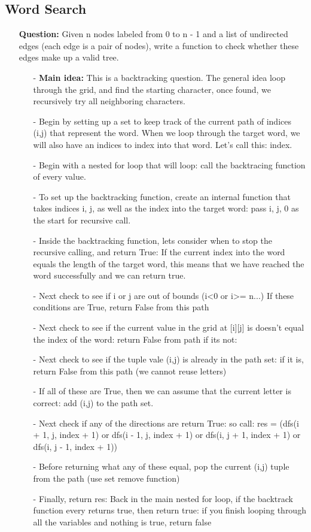 \documentclass[12pt]{article}
\begin{document}
\subsection{Word Search}
\begin{enumerate}
  \item[] \textbf{Question:} Given n nodes labeled from 0 to n - 1 and a list of undirected edges (each edge is a pair of nodes), write a function to check whether these edges make up a valid tree.

    \begin{enumerate}
      \item[-] \textbf{Main idea:} This is a backtracking question. The general idea loop through the grid, and find the starting character, once found, we recursively try all neighboring characters. 
      \item[-] Begin by setting up a set to keep track of the current path of indices (i,j) that represent the word. When we loop through the target word, we will also have an indices to index into that word. Let's call this: index.
      \item[-] Begin with a nested for loop that will loop: call the backtracing function of every value. 
      \item[-] To set up the backtracking function, create an internal function that takes indices i, j, as well as the index into the target word: pass i, j, 0 as the start for recursive call.
      \item[-] Inside the backtracking function, lets consider when to stop the recursive calling, and return True: If the current index into the word equals the length of the target word, this means that we have reached the word successfully and we can return true. 
      \item[-] Next check to see if i or j are out of bounds (i<0 or i>= n...) If these conditions are True, return False from this path
      \item[-] Next check to see if the current value in the grid at [i][j] is doesn't equal the index of the word: return False from path if its not: 
      \item[-] Next check to see if the tuple vale (i,j) is already in the path set: if it is, return False from this path (we cannot reuse letters)
      \item[-] If all of these are True, then we can assume that the current letter is correct: add (i,j) to the path set.
      \item[-] Next check if any of the directions are return True:  so call: 
        res = (dfs(i + 1, j, index + 1) or
                   dfs(i - 1, j, index + 1) or
                   dfs(i, j + 1, index + 1) or
                   dfs(i, j - 1, index + 1))
      \item[-] Before returning what any of these equal, pop the current (i,j) tuple from the path (use set remove function)
      \item[-] Finally, return res: Back in the main nested for loop, if the backtrack function every returns true, then return true: if you finish looping through all the variables and nothing is true, return false


\end{enumerate}
\end{enumerate}
\end{document}
